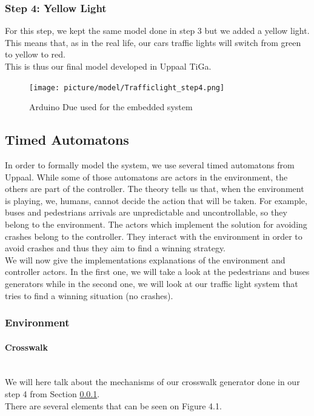 \subsubsection{Step 4: Yellow Light}\label{sec:step4}
For this step, we kept the same model done in step 3 but we added a yellow light. This means that, as in the real life, our cars traffic lights will switch from green to yellow to red. \\
This is thus our final model developed in Uppaal TiGa.

\begin{figure}[H]\label{fig:step4}
  \centering
    \texttt{[image: picture/model/Trafficlight\_step4.png]}
    \caption{Arduino Due used for the embedded system}
\end{figure}

\subsection{Timed Automatons}
In order to formally model the system, we use several timed automatons from Uppaal. While some of those automatons are actors in the environment, the others are part of the controller.
The theory tells us that, when the environment is playing, we, humans, cannot decide the action that will be taken. For example, buses and pedestrians arrivals are unpredictable and uncontrollable, so they belong to the environment.
The actors which implement the solution for avoiding crashes belong to the controller. They interact with the environment in order to avoid crashes and thus they aim to find a winning strategy. \\
We will now give the implementations explanations of the environment and controller actors. In the first one, we will take a look at the pedestrians and buses generators while in the second one, we will look at our traffic light system that tries to find a winning situation (no crashes).

\subsubsection{Environment}
\paragraph{Crosswalk} \mbox{}\\
We will here talk about the mechanisms of our crosswalk generator done in our step 4 from Section \ref{sec:step4}. \\
There are several elements that can be seen on Figure 4.1.

